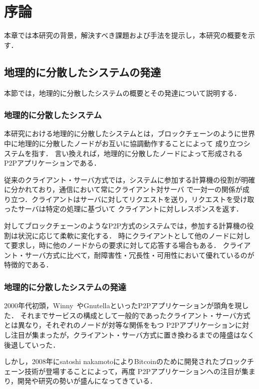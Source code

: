 \chapter{序論}
\label{introduction}

本章では本研究の背景，解決すべき課題および手法を提示し，本研究の概要を示す．

\section{地理的に分散したシステムの発達}
\label{introduction:system-growth}

本節では，地理的に分散したシステムの概要とその発達について説明する．

\subsection{地理的に分散したシステム}

本研究における地理的に分散したシステムとは，ブロックチェーンのように世界中に地理的に分散したノードがお互いに協調動作することによって
成り立つシステムを指す．
言い換えれば，地理的に分散したノードによって形成されるP2Pアプリケーションである．

従来のクライアント・サーバ方式では，システムに参加する計算機の役割が明確に分かれており，通信において常にクライアント対サーバ
で一対一の関係が成り立つ．クライアントはサーバに対してリクエストを送り，リクエストを受け取ったサーバは特定の処理に基づいて
クライアントに対しレスポンスを返す．

対してブロックチェーンのようなP2P方式のシステムでは，参加する計算機の役割は状況に応じて柔軟に変化する．
時にクライアントとして他のノードに対して要求し，時に他のノードからの要求に対して応答する場合もある．
クライアント・サーバ方式に比べて，耐障害性・冗長性・可用性において優れているのが特徴的である．

\subsection{地理的に分散したシステムの発達}

2000年代初頭，Winny~\cite{Winny}やGnutellaといったP2Pアプリケーションが頭角を現した．
それまでサービスの構成として一般的であったクライアント・サーバ方式とは異なり，それぞれのノードが対等な関係をもつ
P2Pアプリケーションに対し注目が集まったが，クライアント・サーバ方式に置き換わるまでの隆盛はなく後退していった．

しかし，2008年にsatoshi nakamotoによりBitcoinのために開発されたブロックチェーン技術が登場することによって，再度
P2Pアプリケーションへの注目が集まり，開発や研究の勢いが盛んになってきている．

